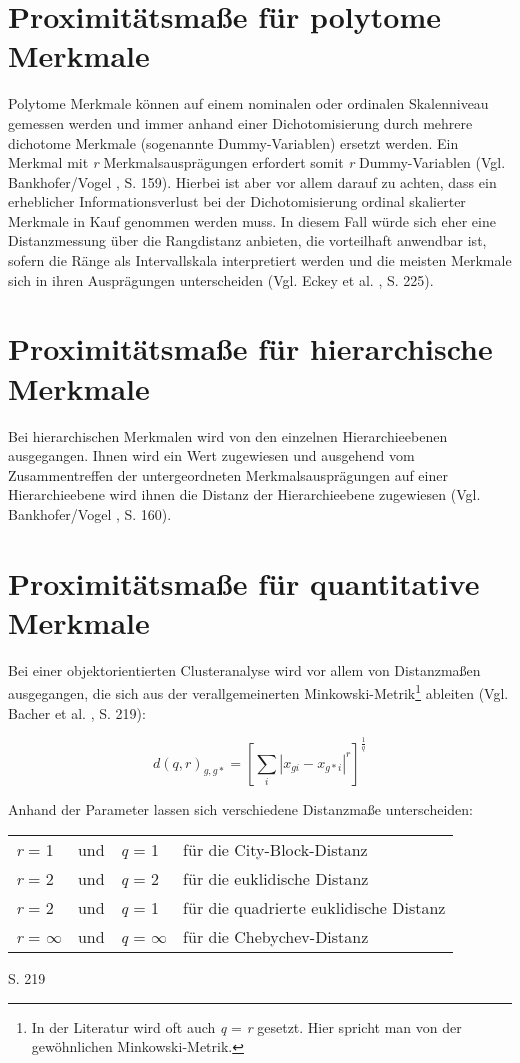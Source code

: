 \section{Proximitätsmaße für polytome Merkmale}
Polytome Merkmale können auf einem nominalen oder ordinalen Skalenniveau gemessen werden und immer anhand einer Dichotomisierung durch mehrere dichotome Merkmale (sogenannte Dummy-Variablen) ersetzt werden. Ein Merkmal mit \textit{r} Merkmalsausprägungen erfordert somit \textit{r} Dummy-Variablen (Vgl. Bankhofer/Vogel \cite{Bankhofer.2008}, S. 159). Hierbei ist aber vor allem darauf zu achten, dass ein erheblicher Informationsverlust bei der Dichotomisierung ordinal skalierter Merkmale in Kauf genommen werden muss. In diesem Fall würde sich eher eine Distanzmessung über die Rangdistanz anbieten, die vorteilhaft anwendbar ist, sofern die Ränge als Intervallskala interpretiert werden und die meisten Merkmale sich in ihren Ausprägungen unterscheiden (Vgl. Eckey et al. \cite{Eckey.2002}, S. 225).

\section{Proximitätsmaße für hierarchische Merkmale}

Bei hierarchischen Merkmalen wird von den einzelnen Hierarchieebenen ausgegangen. Ihnen wird ein Wert zugewiesen und ausgehend vom Zusammentreffen der untergeordneten Merkmalsausprägungen auf einer Hierarchieebene wird ihnen die Distanz der Hierarchieebene zugewiesen (Vgl. Bankhofer/Vogel \cite{Bankhofer.2008}, S. 160).

\section{Proximitätsmaße für quantitative Merkmale}
Bei einer objektorientierten Clusteranalyse wird vor allem von Distanzmaßen ausgegangen, die sich aus der verallgemeinerten Minkowski-Metrik\footnote{In der Literatur wird oft auch \textit{q} = \textit{r} gesetzt. Hier spricht man von der gewöhnlichen Minkowski-Metrik.} ableiten (Vgl. Bacher et al. \cite{Bacher.2010}, S. 219):

\begin{equation}
d(q,r)_{g,g*} = 
\left[	\sum_{i} |x_{gi} - x_{g*i}|^r	\right]^\frac{1}{q}
\end{equation}

Anhand der Parameter lassen sich verschiedene Distanzmaße unterscheiden: 
\begin{center}
\begin{tabular}{lcll}
	\textit{r} = 1 & und & \textit{q} = 1 & für die City-Block-Distanz \\
	\textit{r} = 2 & und & \textit{q} = 2 & für die euklidische Distanz \\
	\textit{r} = 2 & und & \textit{q} = 1 & für die quadrierte euklidische Distanz \\
	\textit{r} = $\infty$ & und & \textit{q} = $\infty$ & für die Chebychev-Distanz \\
\end{tabular}
\end{center}
\cite{Bacher.2010} S. 219

